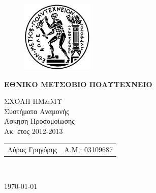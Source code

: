 \begin{titlepage}
    \begin{center}
        \begin{figure}[t] 
            \includegraphics[scale=0.7]{title/ntua_logo}
        \end{figure}
        \begin{LARGE}\textbf{ΕΘΝΙΚΟ ΜΕΤΣΟΒΙΟ ΠΟΛΥΤΕΧΝΕΙΟ\\}\end{LARGE}
        \vspace{2cm}
        \begin{Large}
            ΣΧΟΛΗ ΗΜ\&ΜΥ\\
            Συστήματα Αναμονής\\
            Άσκηση Προσομοίωσης\\
            Ακ. έτος 2012-2013\\
        \end{Large}
        \vfill
        \begin{tabular}{l r}
            \Large{Λύρας Γρηγόρης}&
            \large{Α.Μ.: 03109687}\\
        \end{tabular}\\
        \vspace{5cm}

        \vfill
        \large\today\\
    \end{center}
\end{titlepage}

